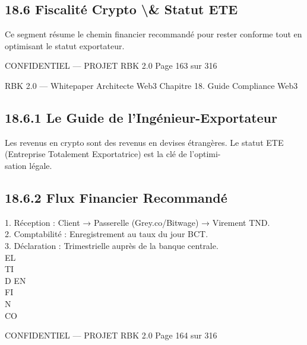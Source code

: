 \subsection{18.6 Fiscalité Crypto \textbackslash{}& Statut ETE}
Ce segment résume le chemin financier recommandé pour rester conforme tout en optimisant le statut exportateur.\\
\vspace{0.5em}
\vspace{0.5em}
\vspace{0.5em}
\begin{confidential}CONFIDENTIEL — PROJET RBK 2.0                                Page 163 sur 316\end{confidential}
RBK 2.0 — Whitepaper Architecte Web3                                                                   Chapitre 18. Guide Compliance Web3\\
\vspace{0.5em}
\vspace{0.5em}
\subsection{18.6.1 Le Guide de l’Ingénieur-Exportateur}
Les revenus en crypto sont des revenus en devises étrangères. Le statut ETE (Entreprise Totalement Exportatrice) est la clé de l’optimi-\\
sation légale.\\
\vspace{0.5em}
\vspace{0.5em}
\subsection{18.6.2 Flux Financier Recommandé}
1. Réception : Client → Passerelle (Grey.co/Bitwage) → Virement TND.\\
\vspace{0.5em}
2. Comptabilité : Enregistrement au taux du jour BCT.\\
\vspace{0.5em}
3. Déclaration : Trimestrielle auprès de la banque centrale.\\
\vspace{0.5em}
\vspace{0.5em}
\vspace{0.5em}
\vspace{0.5em}
EL\\
TI\\
D    EN\\
FI\\
N\\
CO\\
\vspace{0.5em}
\vspace{0.5em}
\vspace{0.5em}
\vspace{0.5em}
\begin{confidential}CONFIDENTIEL — PROJET RBK 2.0                                Page 164 sur 316\end{confidential}

